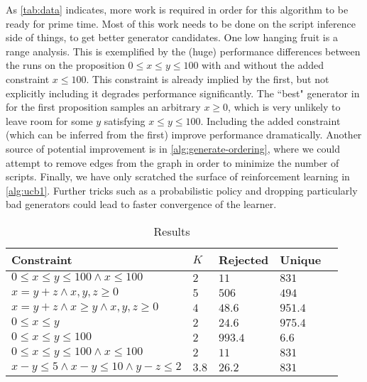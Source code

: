 \documentclass[10pt,a4paper]{article}
\begin{document}
As \autoref{tab:data} indicates, more work is required in order for this algorithm to be ready for prime time. Most of this work needs to be done on the script inference side of things, to get better generator candidates. One low hanging fruit is a range analysis. This is exemplified by the (huge) performance differences between the runs on the proposition $0 \leq x \leq y \leq 100$ with and without the added constraint $x \leq 100$. This constraint is already implied by the first, but not explicitly including it degrades performance significantly. The ``best" generator in for the first proposition samples an arbitrary $x \geq 0$, which is very unlikely to leave room for some $y$ satisfying $x \leq y \leq 100$. Including the added constraint (which can be inferred from the first) improve performance dramatically. Another source of potential improvement is in \autoref{alg:generate-ordering}, where we could attempt to remove edges from the graph in order to minimize the number of scripts. Finally, we have only scratched the surface of reinforcement learning in \autoref{alg:ucb1}. Further tricks such as a probabilistic policy and dropping particularly bad generators could lead to faster convergence of the learner.

\begin{center}
\begin{table}[]
\caption{Results}
\label{tab:data}
\centering
\begin{tabular}{|l|l|l|l|l|}
\hline
Constraint & $K$ & Rejected & Unique \\ \hline
     $0 \leq x \leq y \leq 100 \wedge x \leq 100$ & $2$ & $11$ & $831$ \\ \hline
     $x = y + z \wedge x,y,z \geq 0$      &   $5$   &    $506$      &     $494$   \\ \hline
     $x = y + z \wedge x \geq y \wedge x,y,z \geq 0$      &   $4$  &    $48.6$      &    $951.4$    \\ \hline
     $0 \leq x \leq y $  &  $2$   &  $24.6$   &       $975.4$       \\ \hline
     $0 \leq x \leq y \leq 100$ & $2$ & $993.4$ & $6.6$ \\ \hline
     $0 \leq x \leq y \leq 100 \wedge x \leq 100$ & $2$ & $11$ & $831$ \\ \hline
     $x - y \leq 5 \wedge x - y \leq 10 \wedge y - z \leq 2$ & $3.8$ & $26.2$ & $831$ \\ \hline
\end{tabular}
\end{table}
\end{center}
\end{document}
